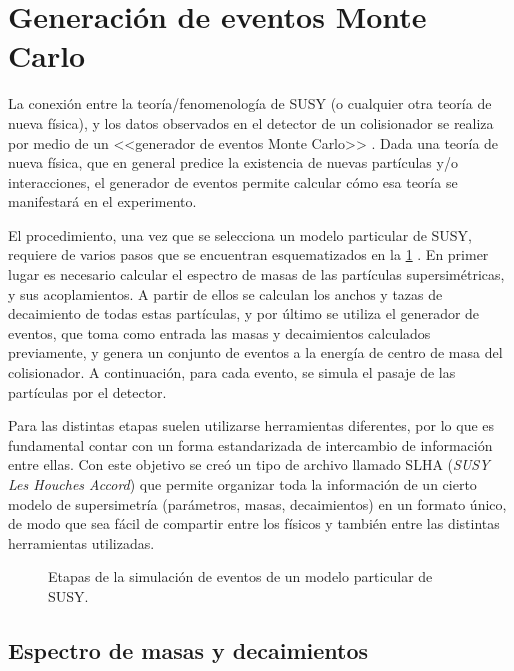 \section{Generación de eventos Monte Carlo}

La conexión entre la teoría/fenomenología de SUSY (o cualquier otra teoría de
nueva física), y los datos observados en el detector de un colisionador se
realiza por medio de un <<generador de eventos Monte Carlo>>
\cite{Sjostrand:2006su,Dobbs:2004qw}. Dada una teoría de nueva física, que en
general predice la existencia de nuevas partículas y/o interacciones, el
generador de eventos permite calcular cómo esa teoría se manifestará en el
experimento.

El procedimiento, una vez que se selecciona un modelo particular de SUSY,
requiere de varios pasos que se encuentran esquematizados en la
\cref{fig:mc_sketch} \cite{Baer:2009tk}. En primer lugar es necesario calcular
el espectro de masas de las partículas supersimétricas, y sus acoplamientos. A
partir de ellos se calculan los anchos y tazas de decaimiento de todas estas
partículas, y por último se utiliza el generador de eventos, que toma como entrada las
masas y decaimientos calculados previamente, y genera un conjunto de eventos a
la energía de centro de masa del colisionador. A continuación, para cada evento,
se simula el pasaje de las partículas por el detector.

Para las distintas etapas suelen
utilizarse herramientas diferentes, por lo que es fundamental contar con un
forma estandarizada de intercambio de información entre ellas. Con este objetivo
se creó un tipo de archivo llamado SLHA (\emph{SUSY Les Houches Accord})\cite{SLHA} que
permite organizar toda la información de un cierto modelo de supersimetría
(parámetros, masas, decaimientos) en un formato único, de modo que sea fácil de
compartir entre los físicos y también entre las distintas herramientas
utilizadas.

\begin{figure}[!htbp]
  \centering

  \scalebox{0.71}{}

  \caption{Etapas de la simulación de eventos de un modelo particular de SUSY.}
  \label{fig:mc_sketch}
\end{figure}


\subsection{Espectro de masas y decaimientos}

